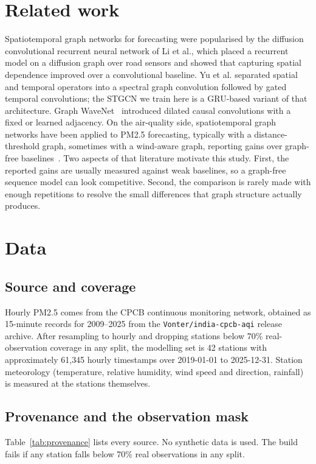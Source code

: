 \documentclass[11pt,a4paper]{article}
\begin{document}
\section{Related work}
Spatiotemporal graph networks for forecasting were popularised by the diffusion
convolutional recurrent neural network of Li et al.\cite{dcrnn}, which placed a
recurrent model on a diffusion graph over road sensors and showed that capturing
spatial dependence improved over a convolutional baseline.  Yu et al.\cite{stgcn}
separated spatial and temporal operators into a spectral graph convolution
followed by gated temporal convolutions; the STGCN we train here is a GRU-based
variant of that architecture.  Graph WaveNet~\cite{graphwavenet} introduced
dilated causal convolutions with a fixed or learned adjacency.
On the air-quality side, spatiotemporal graph networks have been applied to
PM2.5 forecasting, typically with a distance-threshold graph, sometimes with a
wind-aware graph, reporting gains over graph-free baselines~\cite{pm25gnn}.
Two aspects of that literature motivate this study.  First, the reported gains
are usually measured against weak baselines, so a graph-free sequence model
can look competitive.  Second, the comparison is rarely made with enough
repetitions to resolve the small differences that graph structure actually
produces.

\section{Data}
\subsection{Source and coverage}
Hourly PM2.5 comes from the CPCB continuous monitoring network, obtained as
15-minute records for 2009--2025 from the \texttt{Vonter/india-cpcb-aqi}
release archive.  After resampling to hourly and dropping stations below 70\%
real-observation coverage in any split, the modelling set is 42 stations with
approximately 61{,}345 hourly timestamps over 2019-01-01 to 2025-12-31.
Station meteorology (temperature, relative humidity, wind speed and direction,
rainfall) is measured at the stations themselves.

\subsection{Provenance and the observation mask}
Table~\ref{tab:provenance} lists every source.  No synthetic data is used.
The build fails if any station falls below 70\% real observations in any split.
\end{document}
